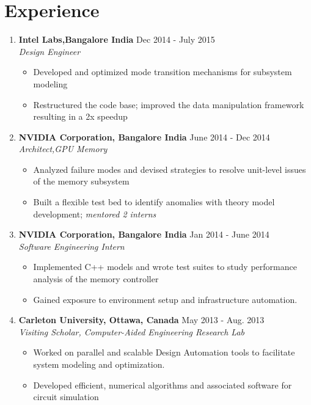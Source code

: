 \documentclass[resmargin,line]{res}
\begin{document}
\section{\sc Experience}
\begin{enumerate}[leftmargin=0.12cm, itemsep=2pt]
\item[] \textbf{Intel Labs,Bangalore India }  \hfill Dec 2014 - July 2015 \\
\textit{Design Engineer}
\begin{itemize}[noitemsep]
  \item Developed and optimized mode transition mechanisms for subsystem modeling %
  \item Restructured the code base; improved the data manipulation framework resulting in a 2x speedup
\end{itemize}
\item[] \textbf{NVIDIA Corporation, Bangalore India } \hfill June 2014 - Dec 2014 \\
\textit{Architect,GPU Memory}
\begin{itemize}[noitemsep]
  \item Analyzed failure modes and devised strategies to resolve unit-level issues of the memory subsystem
  \item Built a flexible test bed to identify anomalies with theory model development; \textit{mentored 2 interns}
\end{itemize}
\item[] \textbf{NVIDIA Corporation, Bangalore India }  \hfill Jan 2014 - June 2014 \\
\textit{Software Engineering Intern}
\begin{itemize}[noitemsep]
  \item Implemented C++ models and wrote test suites to study performance analysis of the memory controller
  \item Gained exposure to environment setup and infrastructure automation.
\end{itemize}
\item[] \textbf{Carleton University, Ottawa, Canada}  \hfill May 2013 - Aug. 2013 \\
\textit{Visiting Scholar, Computer-Aided Engineering Research Lab}
\begin{itemize}[noitemsep]
  \item Worked on parallel and scalable Design Automation tools to facilitate system modeling and optimization.
  \item Developed efficient, numerical algorithms and associated software for circuit simulation
\end{itemize}
\end{enumerate}
\end{document}
